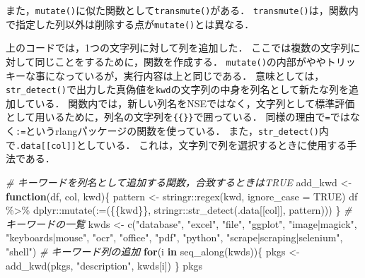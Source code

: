 \documentclass[
]{article}
\newenvironment{Shaded}{\begin{snugshade}}{\end{snugshade}}
\newcommand{\AttributeTok}[1]{\textcolor[rgb]{0.77,0.63,0.00}{#1}}
\newcommand{\CommentTok}[1]{\textcolor[rgb]{0.56,0.35,0.01}{\textit{#1}}}
\newcommand{\ConstantTok}[1]{\textcolor[rgb]{0.00,0.00,0.00}{#1}}
\newcommand{\ControlFlowTok}[1]{\textcolor[rgb]{0.13,0.29,0.53}{\textbf{#1}}}
\newcommand{\FunctionTok}[1]{\textcolor[rgb]{0.00,0.00,0.00}{#1}}
\newcommand{\NormalTok}[1]{#1}
\newcommand{\OtherTok}[1]{\textcolor[rgb]{0.56,0.35,0.01}{#1}}
\newcommand{\SpecialCharTok}[1]{\textcolor[rgb]{0.00,0.00,0.00}{#1}}
\newcommand{\StringTok}[1]{\textcolor[rgb]{0.31,0.60,0.02}{#1}}
\begin{document}
また，\texttt{mutate()}に似た関数として\texttt{transmute()}がある．
\texttt{transmute()}は，関数内で指定した列以外は削除する点が\texttt{mutate()}とは異なる．

上のコードでは，1つの文字列に対して列を追加した．
ここでは複数の文字列に対して同じことをするために，関数を作成する．
\texttt{mutate()}の内部がややトリッキーな事になっているが，実行内容は上と同じである．
意味としては，\texttt{str\_detect()}で出力した真偽値を\texttt{kwd}の文字列の中身を列名として新たな列を追加している．
関数内では，新しい列名をNSEではなく，文字列として標準評価として用いるために，列名の文字列を\texttt{\{\{\}\}}で囲っている．
同様の理由で\texttt{=}ではなく\texttt{:=}というrlangパッケージの関数を使っている．
また，\texttt{str\_detect()}内で\texttt{.data{[}{[}col{]}{]}}としている．
これは，文字列で列を選択するときに使用する手法である．

\begin{Shaded}
\begin{Highlighting}[]
  \CommentTok{\# キーワードを列名として追加する関数，合致するときはTRUE}
\NormalTok{add\_kwd }\OtherTok{\textless{}{-}} \ControlFlowTok{function}\NormalTok{(df, col, kwd)\{}
\NormalTok{  pattern }\OtherTok{\textless{}{-}}\NormalTok{ stringr}\SpecialCharTok{::}\FunctionTok{regex}\NormalTok{(kwd, }\AttributeTok{ignore\_case =} \ConstantTok{TRUE}\NormalTok{)}
\NormalTok{  df }\SpecialCharTok{\%\textgreater{}\%}
\NormalTok{    dplyr}\SpecialCharTok{::}\FunctionTok{mutate}\NormalTok{(}\StringTok{\textasciigrave{}}\AttributeTok{:=}\StringTok{\textasciigrave{}}\NormalTok{(\{\{kwd\}\}, stringr}\SpecialCharTok{::}\FunctionTok{str\_detect}\NormalTok{(.data[[col]], pattern)))}
\NormalTok{\}}
  \CommentTok{\# キーワードの一覧}
\NormalTok{kwds }\OtherTok{\textless{}{-}} 
  \FunctionTok{c}\NormalTok{(}\StringTok{"database"}\NormalTok{, }\StringTok{"excel"}\NormalTok{, }\StringTok{"file"}\NormalTok{, }\StringTok{"ggplot"}\NormalTok{, }\StringTok{"image|magick"}\NormalTok{, }\StringTok{"keyboards|mouse"}\NormalTok{, }
    \StringTok{"ocr"}\NormalTok{, }\StringTok{"office"}\NormalTok{, }\StringTok{"pdf"}\NormalTok{, }\StringTok{"python"}\NormalTok{, }\StringTok{"scrape|scraping|selenium"}\NormalTok{, }\StringTok{"shell"}\NormalTok{)}
  \CommentTok{\# キーワード列の追加}
\ControlFlowTok{for}\NormalTok{(i }\ControlFlowTok{in} \FunctionTok{seq\_along}\NormalTok{(kwds))\{}
\NormalTok{  pkgs }\OtherTok{\textless{}{-}} \FunctionTok{add\_kwd}\NormalTok{(pkgs, }\StringTok{"description"}\NormalTok{, kwds[i])}
\NormalTok{\}}
\NormalTok{pkgs}
\end{Highlighting}
\end{Shaded}
\end{document}
